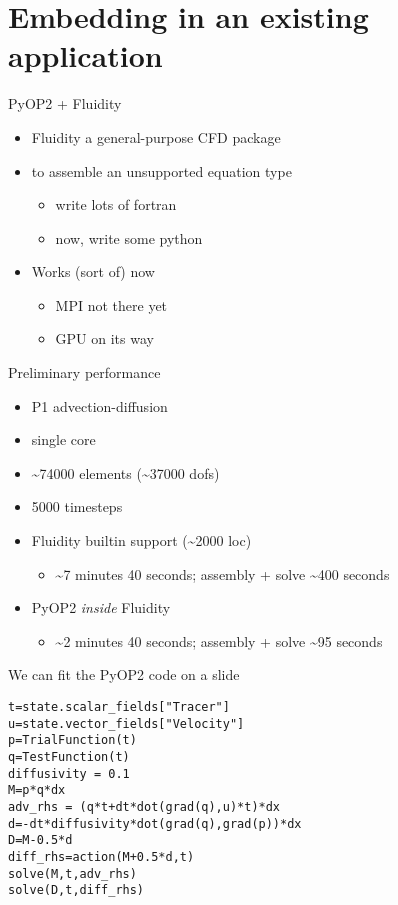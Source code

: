 \documentclass[bigger]{beamer}
\begin{document}
\section{Embedding in an existing application}
\label{sec:orgheadline33}
\begin{frame}[label={sec:orgheadline28}]{PyOP2 + Fluidity}
\begin{itemize}
\item Fluidity a general-purpose CFD package
\item to assemble an unsupported equation type
\begin{itemize}
\item write lots of fortran
\item now, write some python
\end{itemize}

\item Works (sort of) now
\begin{itemize}
\item MPI not there yet
\item GPU on its way
\end{itemize}
\end{itemize}
\end{frame}

\begin{frame}[label={sec:orgheadline29}]{Preliminary performance}
\begin{itemize}
\item P1 advection-diffusion
\item single core
\item \textasciitilde{}74000 elements (\textasciitilde{}37000 dofs)
\item 5000 timesteps
\item Fluidity builtin support (\textasciitilde{}2000 loc)
\begin{itemize}
\item \textasciitilde{}7 minutes 40 seconds; assembly + solve \textasciitilde{}400 seconds
\end{itemize}
\item PyOP2 \emph{inside} Fluidity
\begin{itemize}
\item \textasciitilde{}2 minutes 40 seconds; assembly + solve \textasciitilde{}95 seconds
\end{itemize}
\end{itemize}
\end{frame}

\begin{frame}[fragile,label={sec:orgheadline30}]{We can fit the PyOP2 code on a slide}
 \begin{verbatim}
t=state.scalar_fields["Tracer"]
u=state.vector_fields["Velocity"]
p=TrialFunction(t)
q=TestFunction(t)
diffusivity = 0.1
M=p*q*dx
adv_rhs = (q*t+dt*dot(grad(q),u)*t)*dx
d=-dt*diffusivity*dot(grad(q),grad(p))*dx
D=M-0.5*d
diff_rhs=action(M+0.5*d,t)
solve(M,t,adv_rhs)
solve(D,t,diff_rhs)
\end{verbatim}
\end{frame}
\end{document}
